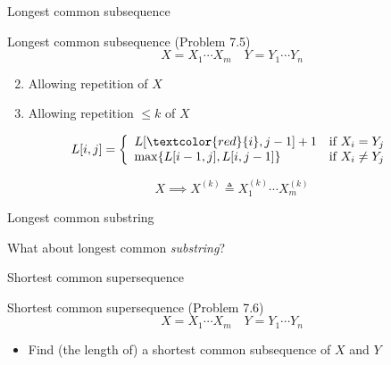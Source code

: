 \begin{frame}{Longest common subsequence}
  \begin{exampleblock}{Longest common subsequence (Problem 7.5)}
	\[
	  X = X_{1} \cdots X_{m} \quad Y = Y_{1} \cdots Y_{n}
	\]

	\begin{enumerate}[(1)]
	  \setcounter{enumi}{1}
	  \item Allowing repetition of $X$
	  \item Allowing repetition $\le k$ of $X$
	\end{enumerate}
  \end{exampleblock}

  \pause
  \begin{displaymath}
	L[i,j] = \left\{ \begin{array}{ll}
	  L[\textcolor{red}{i}, j-1] + 1 & \textrm{if $X_{i} = Y_{j}$}\\
	  \max \set{L[i-1,j], L[i,j-1]} & \textrm{if $X_{i} \neq Y_{j}$}
	\end{array} \right.
  \end{displaymath}

  \pause
  \[
	X \implies X^{(k)} \triangleq X_{1}^{(k)} \cdots X_{m}^{(k)}
  \]
\end{frame}
\begin{frame}{Longest common substring}
  \centerline{What about longest common \emph{substring}?}
\end{frame}
\begin{frame}{Shortest common supersequence}
  \begin{exampleblock}{Shortest common supersequence (Problem 7.6)}
	\[
	  X = X_{1} \cdots X_{m} \quad Y = Y_{1} \cdots Y_{n}
	\]

	\begin{itemize}
	  \item Find (the length of) a shortest common subsequence of $X$ and $Y$
	\end{itemize}
  \end{exampleblock}
\end{frame}
